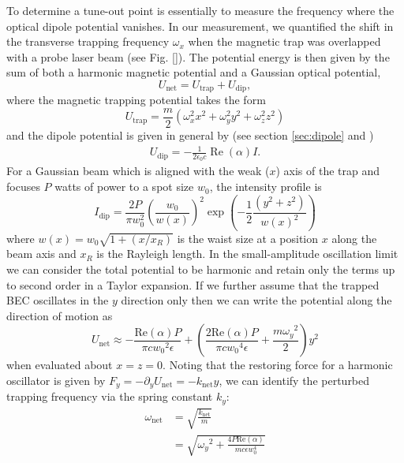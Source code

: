 	To determine a tune-out point is essentially to measure the frequency where the optical dipole potential  vanishes.
	In our measurement, we quantified the shift in the transverse trapping frequency $\omega_x$ when the magnetic trap was overlapped with a probe laser beam (see Fig. \ref{}). 
	The potential energy is then given by the sum of both a harmonic magnetic potential and a Gaussian optical potential,
	\begin{equation}
		U_\mathrm{net} = U_{\mathrm{trap}} + U_\mathrm{dip},
	\end{equation}
	where the magnetic trapping potential takes the form
	\begin{equation}
		U_\mathrm{trap} = \frac{m}{2}\left(\omega_{x}^{2}x^2+\omega_{y}^{2}y^2+\omega_{z}^{2}z^2 \right)
	\end{equation}
	and the dipole potential is given in general by (see section \ref{sec:dipole} and \cite{Grimm00})
	\begin{align}
	    U_{\mathrm{dip}}=-\frac{1}{2 \epsilon_{0} c} \operatorname{Re}(\alpha) I.
	\end{align}
	For a Gaussian beam which is aligned with the weak ($x$) axis of the trap and focuses $P$ watts of power to a spot size $w_0$, the intensity profile is 
	\begin{equation}
	    I_{\mathrm{dip}} =
	        \frac{2 P}{\pi w_0^2} \left(\frac{w_0}{w(x)}\right)^2 \exp\left( -\frac{1}{2} \frac{(y^2+z^2)}{w(x)^2} \right)
	 \end{equation}
	 where $w(x) = w_0\sqrt{1+(x/x_R)}$ is the waist size at a position $x$ along the beam axis and $x_R$ is the Rayleigh length. 
	 In the small-amplitude oscillation limit we can consider the total potential to be harmonic and retain only the terms up to second order in a Taylor expansion. If we further assume that the trapped BEC oscillates in the $y$ direction only then we can write the potential along the direction of motion as
	 \begin{equation}
	 U_\mathrm{net} \approx -\frac{\mathrm{Re}(\alpha)  P}{\pi 
   c {w_0}^2 \epsilon} + \left(\frac{2 \mathrm{Re}(\alpha)  P}{\pi  c {w_0}^4 \epsilon }+\frac{m {\omega_y}^2}{2}\right) y^2
	 \end{equation}
	 when evaluated about $x=z=0$.
	 Noting that the restoring force for a harmonic oscillator is given by $F_y = -\partial_y U_\mathrm{net} = -k_\mathrm{net} y$, we can identify the perturbed trapping frequency via the spring constant $k_y$:
	 \begin{align}
	 	\omega_\mathrm{net} &= \sqrt{\frac{k_\mathrm{net}}{m}}\\
	 	&= \sqrt{{\omega_y}^2+\frac{4 P \mathrm{Re}(\alpha)}{m c \epsilon w_{0}^4}}
	 \end{align}
